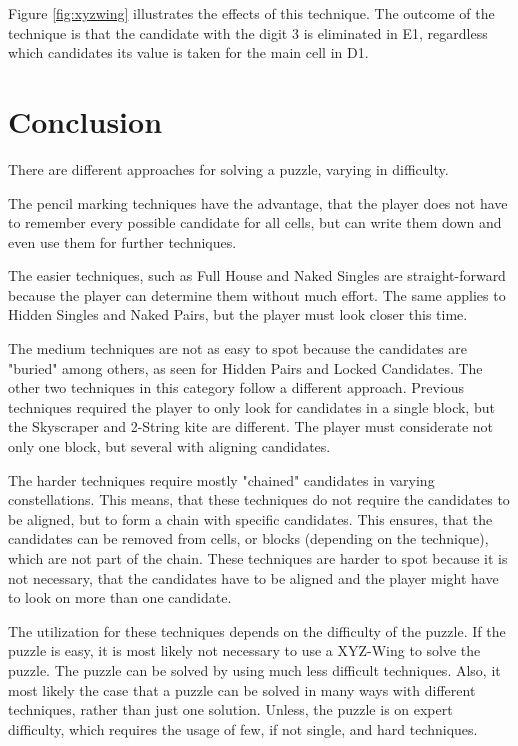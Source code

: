 \documentclass[twoside]{ausarbeitung}
\begin{document}
Figure \ref{fig:xyzwing} illustrates the effects of this technique. The outcome of the technique is that the candidate with the digit 3 is eliminated in E1, regardless which candidates its value is taken for the main cell in D1.




\chapter{Conclusion}
There are different approaches for solving a puzzle, varying in difficulty. 

The pencil marking techniques have the advantage, that the player does not have to remember every possible candidate for all cells, but can write them down and even use them for further techniques.

The easier techniques, such as Full House and Naked Singles are straight-forward because the player can determine them without much effort. The same applies to Hidden Singles and Naked Pairs, but the player must look closer this time. 

The medium techniques are not as easy to spot because the candidates are "buried" among others, as seen for Hidden Pairs and Locked Candidates. The other two techniques in this category follow a different approach. Previous techniques required the player to only look for candidates in a single block, but the Skyscraper and 2-String kite are different. The player must considerate not only one block, but several with aligning candidates.

The harder techniques require mostly "chained" candidates in varying constellations. This means, that these techniques do not require the candidates to be aligned, but to form a chain with specific candidates. This ensures, that the candidates can be removed from cells, or blocks (depending on the technique), which are not part of the chain. These techniques are harder to spot because it is not necessary, that the candidates have to be aligned and the player might have to look on more than one candidate.

The utilization for these techniques depends on the difficulty of the puzzle. If the puzzle is easy, it is most likely not necessary to use a XYZ-Wing to solve the puzzle. The puzzle can be solved by using much less difficult techniques. Also, it most likely the case that a puzzle can be solved in many ways with different techniques, rather than just one solution. Unless, the puzzle is on expert difficulty, which requires the usage of few, if not single, and hard techniques.








\cleardoublepage
{}
 

\end{document}
